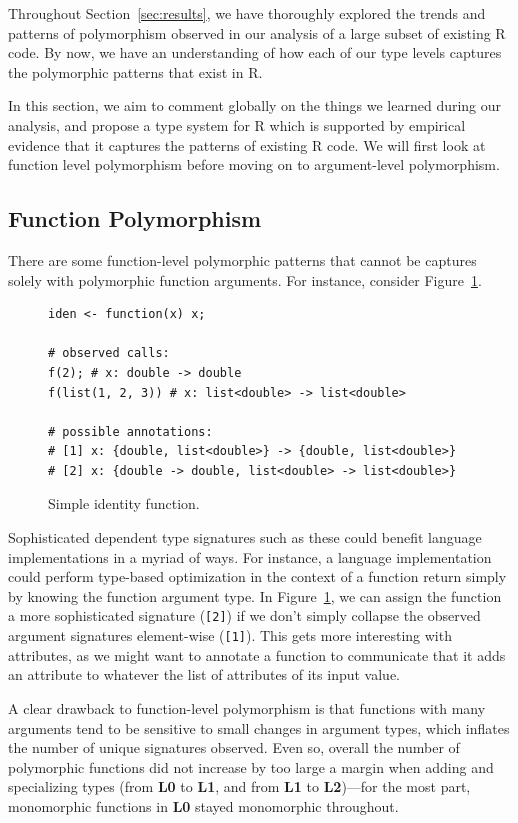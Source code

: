 \documentclass[acmsmall,10pt,review,anonymous]{acmart}\settopmatter{printfolios=true,printccs=false,printacmref=false}
\begin{document}
Throughout Section~\ref{sec:results}, we have thoroughly explored the trends and patterns of polymorphism observed in our analysis of a large subset of existing R code.
By now, we have an understanding of how each of our type levels captures the polymorphic patterns that exist in R.

In this section, we aim to comment globally on the things we learned during our analysis, and propose a type system for R which is supported by empirical evidence that it captures the patterns of existing R code.
We will first look at function level polymorphism before moving on to argument-level polymorphism.

%
%
%
%
\subsection{Function Polymorphism}

There are some function-level polymorphic patterns that cannot be captures solely with polymorphic function arguments.
For instance, consider Figure~\ref{fig:funanno}.

\begin{figure}[!hb]{\small\begin{lstlisting}[style=R]
iden <- function(x) x;

# observed calls:
f(2); # x: double -> double
f(list(1, 2, 3)) # x: list<double> -> list<double>

# possible annotations:
# [1] x: {double, list<double>} -> {double, list<double>}
# [2] x: {double -> double, list<double> -> list<double>}
\end{lstlisting}}\caption{Simple identity function.}\label{fig:funanno}\end{figure}

Sophisticated dependent type signatures such as these could benefit language implementations in a myriad of ways.
For instance, a language implementation could perform type-based optimization in the context of a function return simply by knowing the function argument type.
In Figure~\ref{fig:funanno}, we can assign the function a more sophisticated signature ({\tt [2]}) if we don't simply collapse the observed argument signatures element-wise ({\tt [1]}).
This gets more interesting with attributes, as we might want to annotate a function to communicate that it adds an attribute to whatever the list of attributes of its input value.

A clear drawback to function-level polymorphism is that functions with many arguments tend to be sensitive to small changes in argument types, which inflates the number of unique signatures observed.
Even so, overall the number of polymorphic functions did not increase by too large a margin when adding and specializing types (from {\bf L0} to {\bf L1}, and from {\bf L1} to {\bf L2})---for the most part, monomorphic functions in {\bf L0} stayed monomorphic throughout.
\end{document}
